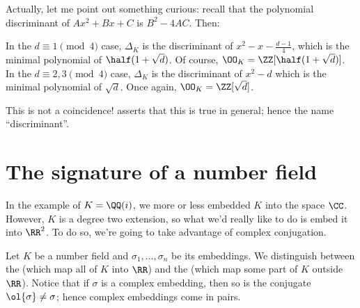Actually, let me point out something curious: recall that the polynomial discriminant of $Ax^2+Bx+C$ is $B^2-4AC$. Then:
\begin{itemize}
	\ii In the $d \equiv 1 \pmod 4$ case,
	$\Delta_K$ is the discriminant of $x^2 - x - \frac{d-1}{4}$,
	which is the minimal polynomial of $\half(1+\sqrt d)$.
	Of course, $\OO_K = \ZZ[\half(1+\sqrt d)]$.
	\ii In the $d \equiv 2,3 \pmod 4$ case,
	$\Delta_K$ is the discriminant of $x^2 - d$
	which is the minimal polynomial of $\sqrt d$. Once again, $\OO_K = \ZZ[\sqrt d]$.
\end{itemize}
This is not a coincidence!  asserts that this is true in general;
hence the name ``discriminant''.

\section{The signature of a number field}
In the example of $K = \QQ(i)$,
we more or less embedded $K$ into the space $\CC$.
However, $K$ is a degree two extension,
so what we'd really like to do is embed it into $\RR^2$.
To do so, we're going to take advantage of complex conjugation.

Let $K$ be a number field and $\sigma_1, \dots, \sigma_n$ be its embeddings.
We distinguish between the 
(which map all of $K$ into $\RR$)
and the 
(which map some part of $K$ outside $\RR$).
Notice that if $\sigma$ is a complex embedding,
then so is the conjugate $\ol{\sigma} \neq \sigma$;
hence complex embeddings come in pairs.

